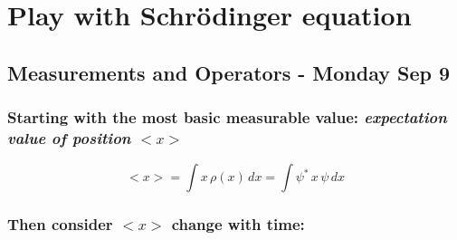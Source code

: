 \section{Play with Schrödinger equation}\SectionRule
    \subsection{\hfill \small Measurements and Operators - Monday Sep 9}
    \subsubsection*{Starting with the most basic measurable value: \textit{expectation value of position} $<x>$}
    \[
        <x> = \int x\,\rho(x)\,dx = \int \psi^*\,x\,\psi\,dx
    \]

    \subsubsection*{Then consider $<x>$ change with time:}
